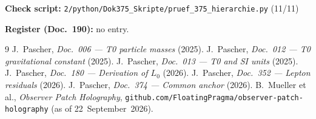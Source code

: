 \medskip
\noindent\textbf{Check script:} \texttt{2/python/Dok375\_Skripte/pruef\_375\_hierarchie.py} (11/11)

\medskip
\noindent\textbf{Register (Doc.~190):} no entry.

\begin{thebibliography}{9}
 J.~Pascher, \emph{Doc.~006 --- T0 particle masses} (2025).
 J.~Pascher, \emph{Doc.~012 --- T0 gravitational constant} (2025).
 J.~Pascher, \emph{Doc.~013 --- T0 and SI units} (2025).
 J.~Pascher, \emph{Doc.~180 --- Derivation of $L_0$} (2026).
 J.~Pascher, \emph{Doc.~352 --- Lepton residuals} (2026).
 J.~Pascher, \emph{Doc.~374 --- Common anchor} (2026).
 B.~Mueller et al., \emph{Observer Patch Holography},
  \texttt{github.com/FloatingPragma/observer-patch-holography} (as of 22~September~2026).
\end{thebibliography}
